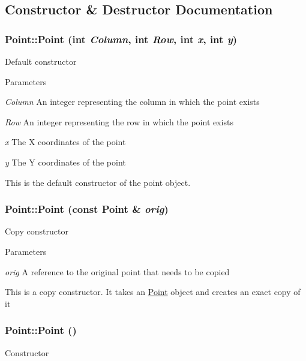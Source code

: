 \subsection{Constructor \& Destructor Documentation}
\hypertarget{classPoint_acd78354f6acd6d1c1bd18c848022ebbc}{
\subsubsection[{Point}]{\setlength{\rightskip}{0pt plus 5cm}Point::Point (int {\em Column}, \/  int {\em Row}, \/  int {\em x}, \/  int {\em y})}}
\label{classPoint_acd78354f6acd6d1c1bd18c848022ebbc}
Default constructor 
\begin{DoxyParams}{Parameters}
\item[{\em Column}]An integer representing the column in which the point exists \item[{\em Row}]An integer representing the row in which the point exists \item[{\em x}]The X coordinates of the point \item[{\em y}]The Y coordinates of the point\end{DoxyParams}
This is the default constructor of the point object. \hypertarget{classPoint_a2b6961ba767c68075667c0f3064c6ba9}{
\subsubsection[{Point}]{\setlength{\rightskip}{0pt plus 5cm}Point::Point (const {\bf Point} \& {\em orig})}}
\label{classPoint_a2b6961ba767c68075667c0f3064c6ba9}
Copy constructor 
\begin{DoxyParams}{Parameters}
\item[{\em orig}]A reference to the original point that needs to be copied\end{DoxyParams}
This is a copy constructor. It takes an \hyperlink{classPoint}{Point} object and creates an exact copy of it \hypertarget{classPoint_ad92f2337b839a94ce97dcdb439b4325a}{
\subsubsection[{Point}]{\setlength{\rightskip}{0pt plus 5cm}Point::Point ()}}
\label{classPoint_ad92f2337b839a94ce97dcdb439b4325a}
Constructor

